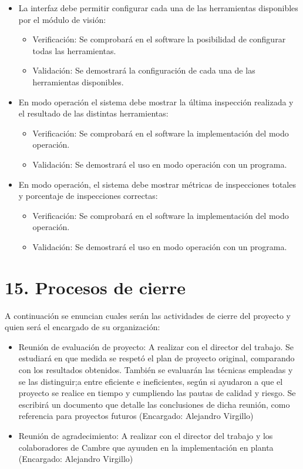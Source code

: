 \documentclass[
11pt, %
codirector, %
]{charter}
\begin{document}
\begin{itemize}
	\item \REQ La interfaz debe permitir configurar cada una de las herramientas disponibles por el módulo de visión:
	\begin{itemize}
		\item Verificación: Se comprobará en el software la posibilidad de configurar todas las herramientas.
		\item Validación: Se demostrará la configuración de cada una de las herramientas disponibles.
	\end{itemize}
	
	\item \REQ En modo operación el sistema debe mostrar la última inspección realizada y el resultado de las distintas herramientas:
	\begin{itemize}
		\item Verificación: Se comprobará en el software la implementación del modo operación.
		\item Validación: Se demostrará el uso en modo operación con un programa.
	\end{itemize}	
	
	\item \REQ En modo operación, el sistema debe mostrar métricas de inspecciones totales y porcentaje de inspecciones correctas:
	\begin{itemize}
		\item Verificación: Se comprobará en el software la implementación del modo operación.
		\item Validación: Se demostrará el uso en modo operación con un programa.
	\end{itemize}	
	
\end{itemize}

\section{15. Procesos de cierre}    
\label{sec:cierre}

A continuación se enuncian cuales serán las actividades de cierre del proyecto y quien será el encargado de su organización:

\begin{itemize}
	\item Reunión de evaluación de proyecto: A realizar con el director del trabajo. Se estudiará en que medida se respetó el plan de proyecto original, comparando con los resultados obtenidos. También se evaluarán las técnicas empleadas y se las distinguir;a entre eficiente e ineficientes, según si ayudaron a que el proyecto se realice en tiempo y cumpliendo las pautas de calidad y riesgo. Se escribirá un documento que detalle las conclusiones de dicha reunión, como referencia para proyectos futuros (Encargado: Alejandro Virgillo)
	\item Reunión de agradecimiento: A realizar con el director del trabajo y los colaboradores de Cambre que ayuuden en la implementación en planta (Encargado: Alejandro Virgillo)
\end{itemize}
\end{document}
